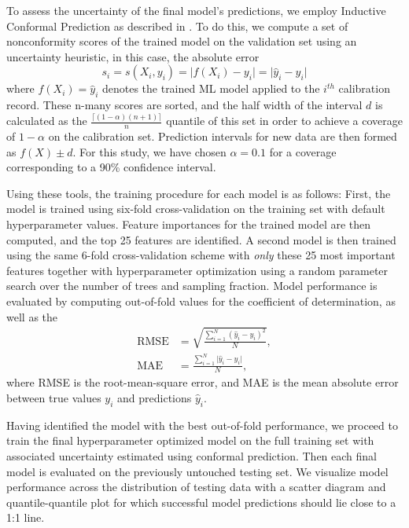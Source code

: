 \documentclass[remotesensing,article,submit,pdftex,moreauthors]{Definitions/mdpi}
\begin{document}
To assess the uncertainty of the final model's predictions, we employ Inductive Conformal Prediction as described in \cite{conformal-prediction-1, conformal-prediction-2, conformal-prediction-3, conformal-prediction-4}. To do this, we compute a set of nonconformity scores of the trained model on the validation set using an uncertainty heuristic, in this case, the absolute error
\begin{equation}
    s_i = s(X_i, y_i) = \lvert f(X_i) - y_i \rvert = \lvert \hat{y}_i - y_i \rvert
\end{equation}
where $f(X_i)=\hat{y}_i$ denotes the trained ML model applied to the $i^{th}$ calibration record. These n-many scores are sorted, and the half width of the interval $d$ is calculated as the $\frac{\lceil(1-\alpha)(n+1) \rceil}{n}$ quantile of this set in order to achieve a coverage of $1-\alpha$ on the calibration set. Prediction intervals for new data are then formed as $f(X)\pm d$. For this study, we have chosen $\alpha=0.1$ for a coverage corresponding to a 90\% confidence interval.

Using these tools, the training procedure for each model is as follows: First, the model is trained using six-fold cross-validation on the training set with default hyperparameter values. Feature importances for the trained model are then computed, and the top 25 features are identified. A second model is then trained using the same 6-fold cross-validation scheme with \textit{ only} these 25 most important features together with hyperparameter optimization using a random parameter search over the number of trees and sampling fraction. Model performance is evaluated by computing out-of-fold values for the coefficient of determination, as well as the
\begin{align}
    \text{RMSE} &= \sqrt{\frac{\sum\limits_{i=1}^N (\hat{y}_i-y_i)^2}{N}}, \\
    \text{MAE} &= \frac{\sum\limits_{i=1}^N \lvert \hat{y}_i - y_i \vert}{N},
\end{align}
where RMSE is the root-mean-square error, and MAE is the mean absolute error between true values $y_i$ and predictions $\hat{y}_i$.

Having identified the model with the best out-of-fold performance, we proceed to train the final hyperparameter optimized model on the full training set with associated uncertainty estimated using conformal prediction.  Then each final model is evaluated on the previously untouched testing set. We visualize model performance across the distribution of testing data with a scatter diagram and quantile-quantile plot for which successful model predictions should lie close to a 1:1 line.
\end{document}
